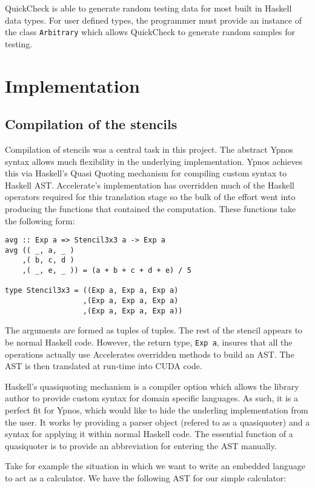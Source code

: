 QuickCheck is able to generate random testing data for most built in
Haskell data types. For user defined types, the programmer must provide
an instance of the class \texttt{Arbitrary} which allows QuickCheck to
generate random samples for testing.

\section{Implementation}

\subsection{Compilation of the stencils}

Compilation of stencils was a central task in this project. The abstract
Ypnos syntax allows much flexibility in the underlying implementation.
Ypnos achieves this via Haskell's Quasi Quoting mechanism for compiling
custom syntax to Haskell AST. Accelerate's implementation has overridden
much of the Haskell operators required for this translation stage so the
bulk of the effort went into producing the functions that contained the
computation. These functions take the following form:

\begin{verbatim}
avg :: Exp a => Stencil3x3 a -> Exp a
avg (( _, a, _ )
    ,( b, c, d )
    ,( _, e, _ )) = (a + b + c + d + e) / 5

type Stencil3x3 = ((Exp a, Exp a, Exp a)
                  ,(Exp a, Exp a, Exp a)
                  ,(Exp a, Exp a, Exp a))
\end{verbatim}

The arguments are formed as tuples of tuples. The rest of the stencil
appears to be normal Haskell code. However, the return type,
\texttt{Exp a}, insures that all the operations actually use Accelerates
overridden methods to build an AST. The AST is then translated at
run-time into CUDA code.

Haskell's quasiquoting mechanism is a compiler option which allows the
library author to provide custom syntax for domain specific languages.
As such, it is a perfect fit for Ypnos, which would like to hide the
underling implementation from the user. It works by providing a parser
object (refered to as a quasiquoter) and a syntax for applying it within
normal Haskell code. The essential function of a quasiquoter is to
provide an abbreviation for entering the AST manually.

Take for example the situation in which we want to write an embedded
language to act as a calculator. We have the following AST for our
simple calculator:

